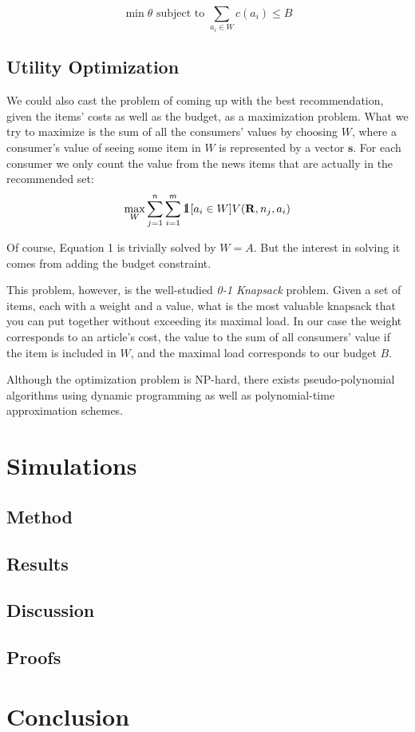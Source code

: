 \documentclass{article}
\def\one{\mbox{1\hspace{-4.25pt}\fontsize{12}{14.4}\selectfont\textrm{1}}} %
\begin{document}
\[\min \theta \text{ subject to } \sum_{a_i\in W}c(a_i)\leq B\]

\subsection{Utility Optimization}
We could also cast the problem of coming up with the best recommendation, 
given the items' costs as well as the budget, as a maximization problem. 
What we try to maximize is the sum of all the consumers' values by choosing $W$, 
where a consumer's value of seeing some item in $W$ is represented by a vector $\mathbf{s}$. 
For each consumer we only count the value from the news items that are actually in the recommended set:\\
\[
\max_W \sum_{j=1}^n \sum_{i=1}^m \one [a_i\in W] V(\mathbf{R}, n_j, a_i)
\]

Of course, Equation 1 is trivially solved by $W=A$. 
But the interest in solving it comes from adding the budget constraint.


This problem, however, is the well-studied {\em 0-1 Knapsack} problem. 
Given a set of items, each with a weight and a value, 
what is the most valuable knapsack that you can put together without exceeding its maximal load. 
In our case the weight corresponds to an article's cost, 
the value to the sum of all consumers' value if the item is included in $W$, 
and the maximal load corresponds to our budget $B$. 

Although the optimization problem is NP-hard, there exists pseudo-polynomial algorithms using dynamic programming 
as well as polynomial-time approximation schemes. 

\section{Simulations}
\subsection{Method}
\subsection{Results}
\subsection{Discussion}
\subsection{Proofs}

\section{Conclusion}



\end{document}
